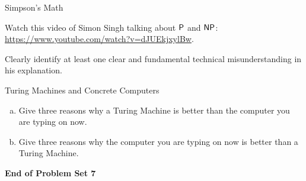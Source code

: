 \documentclass[11pt]{article}
\begin{document}
\begin{problem}
Simpson's Math
\end{problem}

Watch this video of Simon Singh talking about $\mathsf{P}$ and $\mathsf{NP}$: \url{https://www.youtube.com/watch?v=dJUEkjxylBw}.

Clearly identify at least one clear and fundamental technical misunderstanding in his explanation.




\begin{problem} 
Turing Machines and Concrete Computers
\end{problem}

\begin{enumerate}[(a)]
\item Give three reasons why a Turing Machine is better than the computer you are typing on now.
\item Give three reasons why the computer you are typing on now is better than a Turing Machine.
\end{enumerate}


\begin{center}
{\bf End of Problem Set 7} \\
\end{center}
\end{document}

